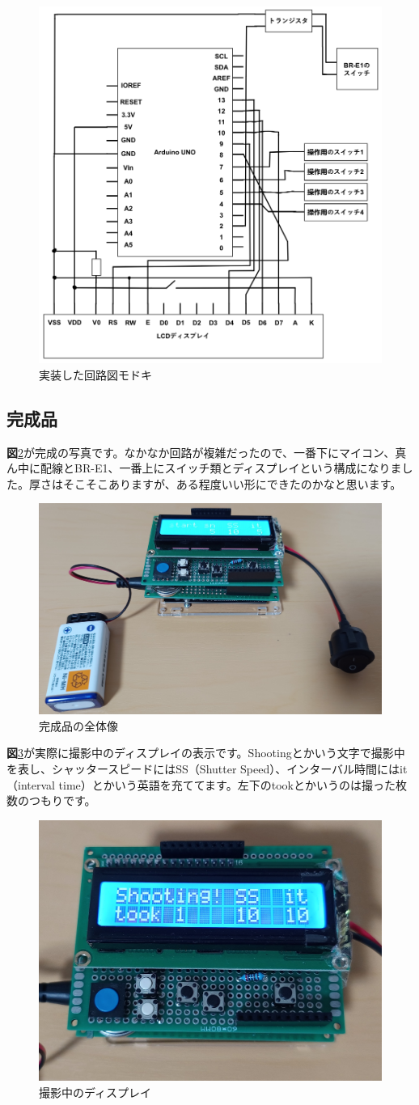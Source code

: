 \documentclass[../main]{subfiles}
\begin{document}
\begin{figure}
    \centering
    \includegraphics[width=0.5\linewidth]{sections/Maruyama/figure/kairozu.png}
    \caption{実装した回路図モドキ}
    \label{kairozu}
\end{figure}

\subsection{完成品}
\textbf{図}\ref{kansei}が完成の写真です。なかなか回路が複雑だったので、一番下にマイコン、真ん中に配線とBR-E1、一番上にスイッチ類とディスプレイという構成になりました。厚さはそこそこありますが、ある程度いい形にできたのかなと思います。

\begin{figure}
    \centering
    \includegraphics[width=0.5\linewidth]{sections/Maruyama/figure/zentai.jpg}
    \caption{完成品の全体像}
    \label{kansei}
\end{figure}
\textbf{図}\ref{jikkou}が実際に撮影中のディスプレイの表示です。Shootingとかいう文字で撮影中を表し、シャッタースピードにはSS（Shutter Speed）、インターバル時間にはit（interval time）とかいう英語を充ててます。左下のtookとかいうのは撮った枚数のつもりです。

\begin{figure}
    \centering
    \includegraphics[width=0.5\linewidth]{sections/Maruyama/figure/jikkou.jpg}
    \caption{撮影中のディスプレイ}
    \label{jikkou}
\end{figure}
\end{document}
